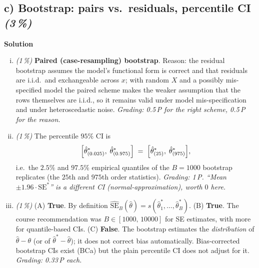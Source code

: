\documentclass[11pt,a4paper]{article}
\newcommand{\subpoints}[1]{\textit{(#1\,\%)}}
\newcommand{\sol}{\noindent\textbf{Solution}}
\begin{document}
\subsection*{c) Bootstrap: pairs vs.\ residuals, percentile CI \subpoints{3}}
\sol{}
\begin{enumerate}[(i)]
  \item \subpoints{1} \textbf{Paired (case-resampling) bootstrap}. Reason: the residual
        bootstrap assumes the model's functional form is correct and that residuals are i.i.d.\
        and exchangeable across $x$; with random $X$ and a possibly mis-specified model the
        paired scheme makes the weaker assumption that the rows themselves are i.i.d., so it
        remains valid under model mis-specification and under heteroscedastic noise.
        \emph{Grading: 0.5\,P for the right scheme, 0.5\,P for the reason.}

  \item \subpoints{1} The percentile $95\%$ CI is
        $$\Bigl[\hat\theta^{*}_{(0.025)},\;\hat\theta^{*}_{(0.975)}\Bigr]
          \;=\; \Bigl[\hat\theta^{*}_{(25)},\;\hat\theta^{*}_{(975)}\Bigr],$$
        i.e.\ the $2.5\%$ and $97.5\%$ empirical quantiles of the $B = 1000$ bootstrap
        replicates (the $25$th and $975$th order statistics).
        \emph{Grading: 1\,P. ``Mean $\pm 1.96\cdot\mathrm{SE}^*$'' is a \emph{different} CI (normal-approximation), worth $0$ here.}

  \item \subpoints{1} (A) \textbf{True}. By definition $\widehat{\mathrm{SE}}_B(\hat\theta) = s(\hat\theta^*_1,\dots,\hat\theta^*_B)$.
        (B) \textbf{True}. The course recommendation was $B \in [1000,\,10000]$ for SE estimates,
        with more for quantile-based CIs.
        (C) \textbf{False}. The bootstrap estimates the \emph{distribution} of $\hat\theta - \theta$
        (or of $\hat\theta^* - \hat\theta$); it does not correct bias automatically. Bias-corrected
        bootstrap CIs exist (BCa) but the plain percentile CI does not adjust for it.
        \emph{Grading: 0.33\,P each.}
\end{enumerate}
\end{document}
